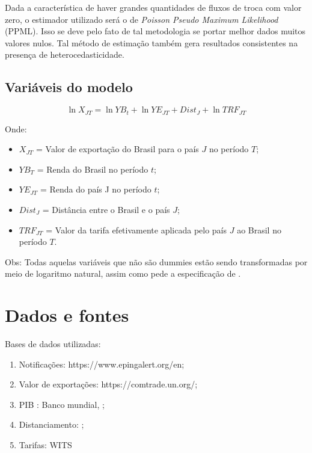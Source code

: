 \documentclass[12pt, a4paper]{article}
\begin{document}
Dada a característica de haver grandes quantidades de fluxos de troca com valor zero, o estimador utilizado será o de \emph{Poisson Pseudo Maximum Likelihood} (PPML). Isso se deve pelo fato de tal metodologia se portar melhor dados muitos valores nulos. Tal método de estimação também gera resultados consistentes na presença de heterocedasticidade. 

\subsection{Variáveis do modelo}

\begin{equation}
    \ln X_{JT} = \ln YB_t + \ln YE_{JT} + Dist_J + \ln TRF_{JT} 
\end{equation}

Onde:

\begin{itemize}
    \item $X_{JT}$ = Valor de exportação do Brasil para o país $J$ no período $T$;
    \item $YB_T$ = Renda do Brasil no período $t$;
    \item $YE_{JT}$ = Renda do país J no período $t$;
    \item $Dist_J$ = Distância entre o Brasil e o país $J$;
    \item $TRF_{JT}$ = Valor da tarifa efetivamente aplicada pelo país $J$ ao Brasil no período $T$.
\end{itemize}

Obs: Todas aquelas variáveis que não são dummies estão sendo transformadas por meio de logaritmo natural, assim como pede a especificação de \cite{Log_Of_Gravity}.


\section{Dados e fontes}

Bases de dados utilizadas:

\begin{enumerate}
    \item Notificações: https://www.epingalert.org/en;
    \item Valor de exportações: https://comtrade.un.org/;
    \item PIB : Banco mundial, \cite{WB};
    \item Distanciamento: \cite{CEPII};
    \item Tarifas: WITS
\end{enumerate}
\end{document}
